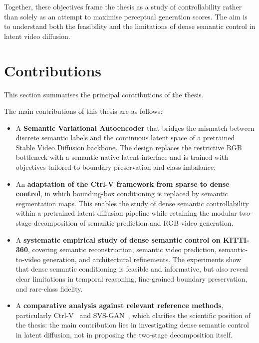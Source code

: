 Together, these objectives frame the thesis as a study of controllability rather than solely as an attempt to maximise perceptual generation scores. The aim is to understand both the feasibility and the limitations of dense semantic control in latent video diffusion.

\section{Contributions}
\label{sec:contributions}

This section summarises the principal contributions of the thesis.

The main contributions of this thesis are as follows:

\begin{itemize}
    \item A \textbf{Semantic Variational Autoencoder} that bridges the mismatch between discrete semantic labels and the continuous latent space of a pretrained Stable Video Diffusion backbone. The design replaces the restrictive RGB bottleneck with a semantic-native latent interface and is trained with objectives tailored to boundary preservation and class imbalance.
    
    \item An \textbf{adaptation of the Ctrl-V framework from sparse to dense control}, in which bounding-box conditioning is replaced by semantic segmentation maps. This enables the study of dense semantic controllability within a pretrained latent diffusion pipeline while retaining the modular two-stage decomposition of semantic prediction and RGB video generation.
    
    \item A \textbf{systematic empirical study of dense semantic control on KITTI-360}, covering semantic reconstruction, semantic video prediction, semantic-to-video generation, and architectural refinements. The experiments show that dense semantic conditioning is feasible and informative, but also reveal clear limitations in temporal reasoning, fine-grained boundary preservation, and rare-class fidelity.
    
    \item A \textbf{comparative analysis against relevant reference methods}, particularly Ctrl-V~\cite{luo2025ctrlv} and SVS-GAN~\cite{seyam2024svsgan}, which clarifies the scientific position of the thesis: the main contribution lies in investigating dense semantic control in latent diffusion, not in proposing the two-stage decomposition itself.
\end{itemize}

